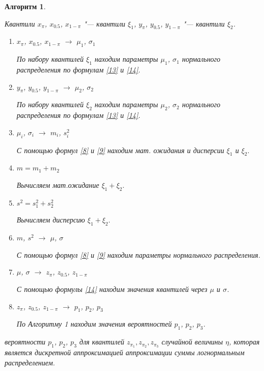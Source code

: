 \documentclass[12pt]{article}
\newtheorem{alg}{Алгоритм}
\newenvironment{pr1}{\par\noindent{\bf Дано:}}{}
\newenvironment{pr3}{\par\noindent{\bf Результат:}}{}
\begin{document}
	\begin{alg}\label{al3}
		\begin{pr1}
			Квантили $x_{\pi}$, $x_{0.5}$, $x_{1-\pi}$ "--- квантили $\xi_{1}$, $y_{\pi}$, $y_{0.5}$, $y_{1-\pi}$ "--- квантили $\xi_{2}$.
		\end{pr1}
		\begin{enumerate}
			\item $x_{\pi}$, $x_{0.5}$, $x_{1-\pi}$ $\rightarrow$  $\mu_{1}$, $\sigma_{1}$
			
			По набору квантилей $\xi_{1}$ находим параметры $\mu_{1}$, $\sigma_{1}$ нормального распределения по формулам \eqref{13} и \eqref{14}.
			\item $y_{\pi}$, $y_{0.5}$, $y_{1-\pi}$ $\rightarrow$ $\mu_{2}$, $\sigma_{2}$
			
			По набору квантилей $\xi_{2}$ находим параметры $\mu_{2}$, $\sigma_{2}$ нормального распределения по формулам \eqref{13} и \eqref{14}.
			\item $\mu_{i}$, $\sigma_{i}$ $\rightarrow$ $m_{i}$, $s_{i}^{2}$
			
			С помощью формул \eqref{8} и \eqref{9} находим мат. ожидания и дисперсии $\xi_{1}$ и $\xi_{2}.$
			\item $m = m_{1}+m_{2}$
			
			Вычисляем мат.ожидание $\xi_{1}+\xi_{2}.$
			\item $s^{2}=s_{1}^{2} + s_{2}^{2}$
			
			Вычисляем дисперсию $\xi_{1}+\xi_{2}.$
			\item $m$, $s^{2}$ $\rightarrow$ $\mu$, $\sigma$
			
			С помощью формул \eqref{8} и \eqref{9} находим параметры нормального распределения.
			\item $\mu$, $\sigma$ $\rightarrow$ $z_{\pi}$, $z_{0.5}$, $z_{1-\pi}$
			
			С помощью формулы \eqref{14} находим значения квантилей через $\mu$ и $\sigma$.
			\item $z_{\pi}$, $z_{0.5}$, $z_{1-\pi}$ $\rightarrow$ $p_{1}$, $p_{2}$, $p_{3}$
			
			По Алгоритму 1 находим значения вероятностей $p_{1}$, $p_{2}$, $p_{3}$.
		\end{enumerate}
		
		\begin{pr3}\end{pr3} вероятности $p_{1}$, $p_{2}$, $p_{3}$ для квантилей $z_{\pi_{1}}, z_{\pi_{2}}, z_{\pi_{3}}$ случайной величины $\eta$, которая является дискретной аппроксимацией аппроксимации суммы логнормальным распределением.
		
	\end{alg}
	
\end{document}
